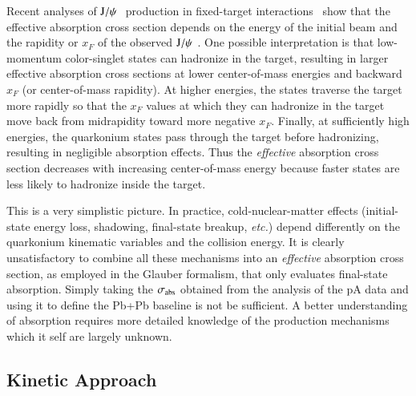 Recent analyses of $\mathrm{J}/\psi\hspace {0.05in}$ production
in fixed-target interactions~\cite{Lourenco:2008sk} 
show that the effective absorption
cross section depends on the energy of the initial beam and the rapidity or
$x_F$ of the observed $\mathrm{J}/\psi\hspace {0.05in}$.  One possible interpretation is that 
low-momentum color-singlet states can hadronize in the
target, resulting in larger effective absorption cross sections at lower
center-of-mass energies and backward $x_F$ (or center-of-mass rapidity).
At higher energies, the states traverse the target more rapidly so that
the $x_F$ values at which they can hadronize in the target move 
back from midrapidity toward more negative $x_F$.
Finally, at sufficiently high energies, the quarkonium states pass 
through the target before hadronizing, resulting in negligible absorption
effects.  Thus the {\it effective} absorption cross section decreases with 
increasing center-of-mass energy because faster states are less likely 
to hadronize inside the target.

This is a very simplistic picture. In practice, cold-nuclear-matter effects 
(initial-state energy loss, shadowing, final-state breakup, {\it etc.}) 
depend differently on the quarkonium kinematic variables and the collision energy. 
It is clearly unsatisfactory to combine all these mechanisms into an {\it effective} 
absorption cross section, as employed in the Glauber formalism, 
that only evaluates final-state absorption. 
Simply taking the $\sigma_{\rm abs}$ obtained from 
the analysis of the pA data 
and using it to define the Pb+Pb baseline is not be sufficient. 
A better understanding of absorption requires more detailed knowledge of the 
production mechanisms which it self are largely unknown.






\subsection{Kinetic Approach}

